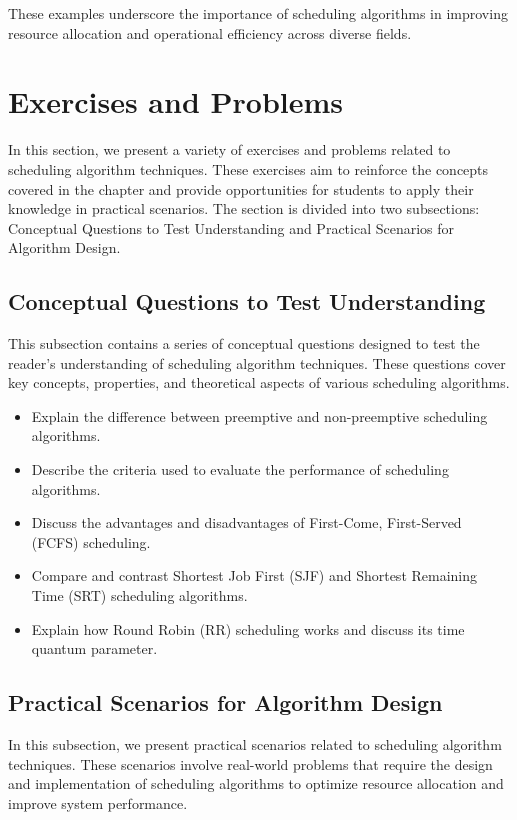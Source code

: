 \documentclass[12pt]{book} %
\begin{document}
These examples underscore the importance of scheduling algorithms in improving resource allocation and operational efficiency across diverse fields.

\section{Exercises and Problems}
In this section, we present a variety of exercises and problems related to scheduling algorithm techniques. These exercises aim to reinforce the concepts covered in the chapter and provide opportunities for students to apply their knowledge in practical scenarios. The section is divided into two subsections: Conceptual Questions to Test Understanding and Practical Scenarios for Algorithm Design.

\subsection{Conceptual Questions to Test Understanding}
This subsection contains a series of conceptual questions designed to test the reader's understanding of scheduling algorithm techniques. These questions cover key concepts, properties, and theoretical aspects of various scheduling algorithms.

\begin{itemize}
    \item Explain the difference between preemptive and non-preemptive scheduling algorithms.
    \item Describe the criteria used to evaluate the performance of scheduling algorithms.
    \item Discuss the advantages and disadvantages of First-Come, First-Served (FCFS) scheduling.
    \item Compare and contrast Shortest Job First (SJF) and Shortest Remaining Time (SRT) scheduling algorithms.
    \item Explain how Round Robin (RR) scheduling works and discuss its time quantum parameter.
\end{itemize}

\subsection{Practical Scenarios for Algorithm Design}
In this subsection, we present practical scenarios related to scheduling algorithm techniques. These scenarios involve real-world problems that require the design and implementation of scheduling algorithms to optimize resource allocation and improve system performance.
\end{document}
